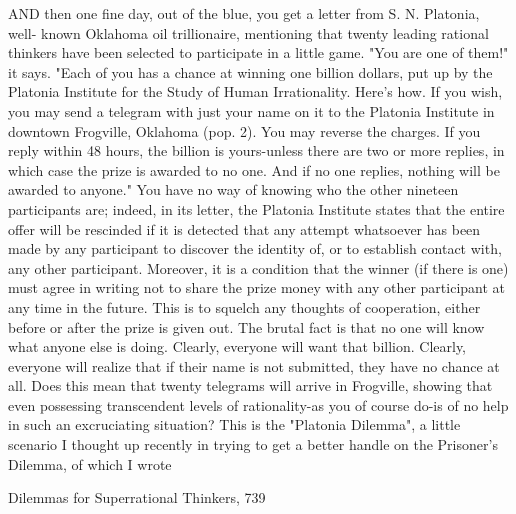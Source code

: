 AND then one fine day, out of the blue, you get a letter from S. N. Platonia, well-
known Oklahoma oil trillionaire, mentioning that twenty leading rational thinkers
have been selected to participate in a little game. "You are one of them!" it says.
"Each of you has a chance at winning one billion dollars, put up by the Platonia
Institute for the Study of Human Irrationality. Here's how. If you wish, you may send
a telegram with just your name on it to the Platonia Institute in downtown Frogville,
Oklahoma (pop. 2). You may reverse the charges. If you reply within 48 hours, the
billion is yours-unless there are two or more replies, in which case the prize is
awarded to no one. And if no one replies, nothing will be awarded to anyone."
         You have no way of knowing who the other nineteen participants are; indeed,
in its letter, the Platonia Institute states that the entire offer will be rescinded if it is
detected that any attempt whatsoever has been made by any participant to discover the
identity of, or to establish contact with, any other participant. Moreover, it is a
condition that the winner (if there is one) must agree in writing not to share the prize
money with any other participant at any time in the future. This is to squelch any
thoughts of cooperation, either before or after the prize is given out.
         The brutal fact is that no one will know what anyone else is doing. Clearly,
everyone will want that billion. Clearly, everyone will realize that if their name is not
submitted, they have no chance at all. Does this mean that twenty telegrams will
arrive in Frogville, showing that even possessing transcendent levels of rationality-as
you of course do-is of no help in such an excruciating situation?
         This is the "Platonia Dilemma", a little scenario I thought up recently in trying
to get a better handle on the Prisoner's Dilemma, of which I wrote




Dilemmas for Superrational Thinkers,                                                    739

